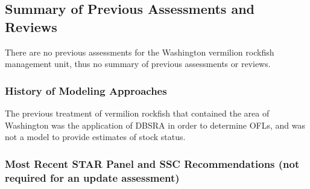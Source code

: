 \documentclass[11pt,
  english,
  a4paper,
]{article}
\begin{document}
\leavevmode\tagmcend\tagstructend\par


\hypertarget{summary-of-previous-assessments-and-reviews}{%
\subsection{Summary of Previous Assessments and Reviews}\label{summary-of-previous-assessments-and-reviews}}

\leavevmode\tagmcend\tagstructend


There are no previous assessments for the Washington vermilion rockfish management unit, thus no summary of previous assessments or reviews.

\leavevmode\tagmcend\tagstructend\par


\hypertarget{history-of-modeling-approaches}{%
\subsubsection{History of Modeling Approaches}\label{history-of-modeling-approaches}}

\leavevmode\tagmcend\tagstructend


The previous treatment of vermilion rockfish that contained the area of Washington was the application of DBSRA in order to determine OFLs, and was not a model to provide estimates of stock status.

\leavevmode\tagmcend\tagstructend\par


\hypertarget{most-recent-star-panel-and-ssc-recommendations-not-required-for-an-update-assessment}{%
\subsubsection{Most Recent STAR Panel and SSC Recommendations (not required for an update assessment)}\label{most-recent-star-panel-and-ssc-recommendations-not-required-for-an-update-assessment}}

\leavevmode\tagmcend\tagstructend
\end{document}
